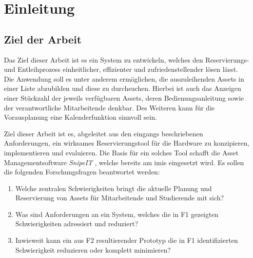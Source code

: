 
\chapter{Einleitung}



\section{Ziel der Arbeit}
Das Ziel dieser Arbeit ist es ein System zu entwickeln, welches den Reservierungs- und Entleihprozess einheitlicher, effizienter und zufriedenstellender lösen lässt. Die Anwendung soll es unter anderem ermöglichen, die auszuleihenden Assets in einer Liste abzubilden und diese zu durchsuchen.
Hierbei ist auch das Anzeigen einer Stückzahl der jeweils verfügbaren Assets, deren Bedienungsanleitung sowie der verantwortliche Mitarbeitende denkbar. Des Weiteren kann für die Vorausplanung
eine Kalenderfunktion sinnvoll sein.

Ziel dieser Arbeit ist es, abgeleitet aus den eingangs beschriebenen Anforderungen, ein wirksames
Reservierungstool für die Hardware zu konzipieren, implementieren und evaluieren. Die Basis für
ein solches Tool schafft die Asset Managementsoftware \textit{SnipeIT} \cite{noauthor_home_nodate}, welche bereits am \ac{imis} eingesetzt wird.
Es sollen die folgenden Forschungsfragen beantwortet werden:

\begin{enumerate}
  \item[\sffamily\color{maincolor} {F1}] {Welche zentralen Schwierigkeiten bringt die aktuelle Planung und Reservierung von Assets für Mitarbeitende und Studierende mit sich?}
  \item[\sffamily\color{maincolor} {F2}] {Was sind Anforderungen an ein System, welches die in F1 gezeigten Schwierigkeiten adressiert und reduziert?}
  \item[\sffamily\color{maincolor} {F3}] {Inwieweit kann ein aus F2 resultierender Prototyp die in F1 identifizierten Schwierigkeit reduzieren oder komplett minimieren?}
\end{enumerate}

